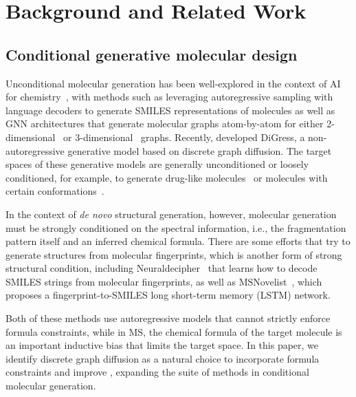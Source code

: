 \section{Background and Related Work}
\subsection{Conditional generative molecular design}

Unconditional molecular generation has been well-explored in the context of AI for chemistry~\citep{zhang2023artificial}, with methods such as \citet{gomez2018automatic,segler2018generating} leveraging autoregressive sampling with language decoders to generate SMILES representations of molecules as well as GNN architectures that generate molecular graphs atom-by-atom for either 2-dimensional~\citep{liu2018constrained,li2018learning,simonovsky2018graphvae} or 3-dimensional~\citep{flam2022scalable,adams2022equivariant,luo2022autoregressive,liu2022generating3dmoleculestarget} graphs. Recently, \citet{vignac2023digress} developed DiGress, a non-autoregressive generative model based on discrete graph diffusion. The target spaces of these generative models are generally unconditioned or loosely conditioned, for example, to generate drug-like molecules~\citep{luo20213d} or molecules with certain conformations~\citep{roney2022generating}.

In the context of \textit{de novo} structural generation, however, molecular generation must be strongly conditioned on the spectral information, i.e., the fragmentation pattern itself and an inferred chemical formula. There are some efforts that try to generate structures from molecular fingerprints, which is another form of strong structural condition, including Neuraldecipher~\citep{le2020neuraldecipher} that learns how to decode SMILES strings from molecular fingerprints, as well as MSNovelist~\citep{stravs2022msnovelist}, which proposes a fingerprint-to-SMILES long short-term memory (LSTM) network. 

Both of these methods use autoregressive models that cannot strictly enforce formula constraints, while in MS, the chemical formula of the target molecule is an important inductive bias that limits the target space. In this paper, we identify discrete graph diffusion as a natural choice to incorporate formula constraints and improve \citet{vignac2023digress}, expanding the suite of methods in conditional molecular generation.


